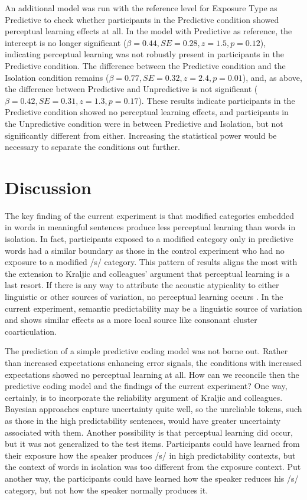 An additional model was run with the reference level for Exposure Type as Predictive to check whether participants in the Predictive condition showed perceptual learning effects at all.
In the model with Predictive as reference, the intercept is no longer significant ($\beta = 0.44, SE = 0.28, z = 1.5, p = 0.12$), indicating perceptual learning was not robustly present in participants in the Predictive condition.  
The difference between the Predictive condition and the Isolation condition remains ($\beta = 0.77, SE = 0.32, z = 2.4, p = 0.01$), and, as above, the difference between Predictive and Unpredictive is not significant ($\beta = 0.42, SE = 0.31, z = 1.3, p = 0.17$).
These results indicate participants in the Predictive condition showed no perceptual learning effects, and participants in the Unpredictive condition were in between Predictive and Isolation, but not significantly different from either.  
Increasing the statistical power would be necessary to separate the conditions out further.


\section{Discussion}

The key finding of the current experiment is that modified categories embedded in words in meaningful sentences produce less perceptual learning than words in isolation.  
In fact, participants exposed to a modified category only in predictive words had a similar boundary as those in the control experiment who had no exposure to a modified /s/ category.
This pattern of results aligns the most with the extension to Kraljic and colleagues' argument that perceptual learning is a last resort.
If there is any way to attribute the acoustic atypicality to either linguistic or other sources of variation, no perceptual learning occurs \citep{Kraljic2008,Kraljic2008a}.
In the current experiment, semantic predictability may be a linguistic source of variation and shows similar effects as a more local source like consonant cluster coarticulation.

The prediction of a simple predictive coding model \citep{Clark2013} was not borne out.
Rather than increased expectations enhancing error signals, the conditions with increased expectations showed no perceptual learning at all.
How can we reconcile then the predictive coding model and the findings of the current experiment?
One way, certainly, is to incorporate the reliability argument of Kraljic and colleagues.
Bayesian approaches capture uncertainty quite well, so the unreliable tokens, such as those in the high predictability sentences, would have greater uncertainty associated with them.
Another possibility is that perceptual learning did occur, but it was not generalized to the test items.
Participants could have learned from their exposure how the speaker produces /s/ in high predictability contexts, but the context of words in isolation was too different from the exposure context.
Put another way, the participants could have learned how the speaker reduces his /s/ category, but not how the speaker normally produces it.

